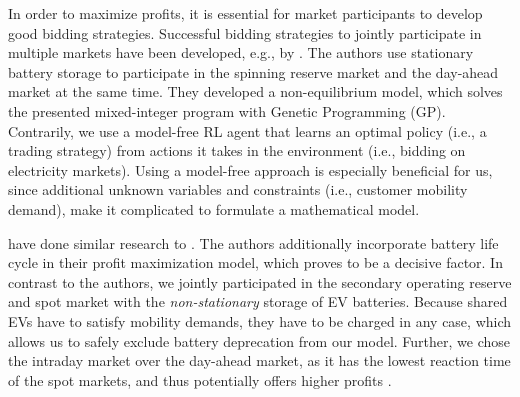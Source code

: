 \documentclass[12pt, article]{article}
\begin{document}
In order to maximize profits, it is essential for market participants to develop good
bidding strategies. Successful bidding strategies to jointly participate in
multiple markets have been developed, e.g., by
\textcite{mashhour11_biddin_strat_virtual_power_plant_2}. The authors use
stationary battery storage to participate in the spinning reserve market and
the day-ahead market at the same time. They developed a non-equilibrium model,
which solves the presented mixed-integer program with Genetic Programming (GP).
Contrarily, we use a model-free RL agent that learns an optimal policy (i.e.,
a trading strategy) from actions it takes in the environment (i.e., bidding on
electricity markets). Using a model-free approach is especially beneficial for
us, since additional unknown variables and constraints (i.e., customer mobility
demand), make it complicated to formulate a mathematical model.

\textcite{he16_optim_biddin_strat_batter_storag} have done similar research to
\textcite{mashhour11_biddin_strat_virtual_power_plant_2}. The authors additionally
incorporate battery life cycle in their profit maximization model,
which proves to be a decisive factor. In contrast to the authors, we jointly
participated in the secondary operating reserve and spot market with the
\emph{non-stationary} storage of EV batteries. Because shared EVs have to satisfy
mobility demands, they have to be charged in any case, which allows us to safely
exclude battery deprecation from our model. Further, we chose the intraday
market over the day-ahead market, as it has the lowest reaction time of the spot
markets, and thus potentially offers higher profits
\parencite{tomic07_using_fleet_elect_drive_vehic_grid_suppor}.
\end{document}
